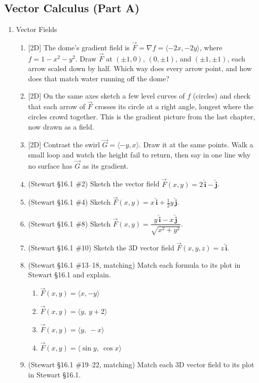 \documentclass[12pt]{article}
\newcommand{\ihat}{\hat{\textbf{i}}}
\newcommand{\jhat}{\hat{\textbf{j}}}
\newcommand{\dimtag}[1]{{\footnotesize\textsc{[#1]}}\;}
\newcounter{topic}
\begin{document}
\subsection*{Vector Calculus (Part A)}
\begin{enumerate}\setcounter{enumi}{\value{topic}}

\item Vector Fields
    \begin{enumerate}
        \item \dimtag{2D} The dome's gradient field is $\vec F = \nabla f = \langle -2x, -2y\rangle$, where $f = 1 - x^2 - y^2$. Draw $\vec F$ at $(\pm1,0)$, $(0,\pm1)$, and $(\pm1,\pm1)$, each arrow scaled down by half. Which way does every arrow point, and how does that match water running off the dome?
        \item \dimtag{2D} On the same axes sketch a few level curves of $f$ (circles) and check that each arrow of $\vec F$ crosses its circle at a right angle, longest where the circles crowd together. This is the gradient picture from the last chapter, now drawn as a field.
        \item \dimtag{2D} Contrast the swirl $\vec G = \langle -y, x\rangle$. Draw it at the same points. Walk a small loop and watch the height fail to return, then say in one line why no surface has $\vec G$ as its gradient.
        \item (Stewart \S16.1 \#2) Sketch the vector field $\vec F(x,y) = 2\,\ihat - \jhat$.
        \item (Stewart \S16.1 \#4) Sketch $\vec F(x,y) = x\,\ihat + \tfrac{1}{2}y\,\jhat$.
        \item (Stewart \S16.1 \#8) Sketch $\vec F(x,y) = \dfrac{y\,\ihat - x\,\jhat}{\sqrt{x^2+y^2}}$.
        \item (Stewart \S16.1 \#10) Sketch the 3D vector field $\vec F(x,y,z) = z\,\ihat$.
        \item (Stewart \S16.1 \#13--18, matching) Match each formula to its plot in Stewart \S16.1 and explain.
        \begin{enumerate}
            \item $\vec F(x,y) = \langle x, -y\rangle$
            \item $\vec F(x,y) = \langle y,\ y+2\rangle$
            \item $\vec F(x,y) = \langle y,\ -x\rangle$
            \item $\vec F(x,y) = \langle \sin y,\ \cos x\rangle$
        \end{enumerate}
        \item (Stewart \S16.1 \#19--22, matching) Match each 3D vector field to its plot in Stewart \S16.1.

\end{enumerate}
\end{enumerate}
\end{document}
